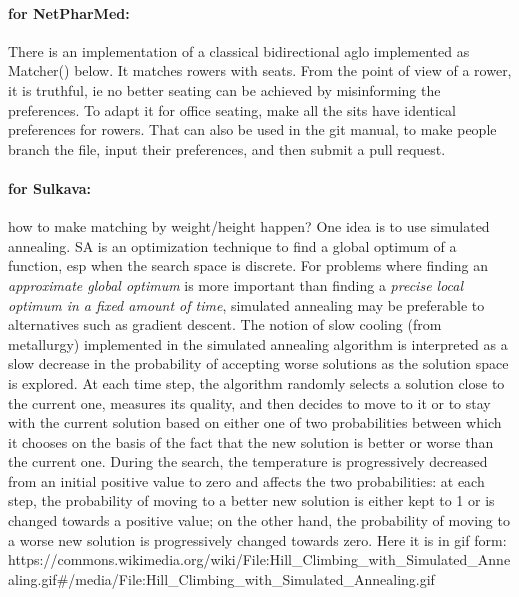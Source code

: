 \documentclass[11pt]{article}
\begin{document}
\hypertarget{for-netpharmed}{%
\paragraph{for NetPharMed:}\label{for-netpharmed}}

There is an implementation of a classical bidirectional aglo implemented
as Matcher() below. It matches rowers with seats. From the point of view
of a rower, it is truthful, ie no better seating can be achieved by
misinforming the preferences. To adapt it for office seating, make all
the sits have identical preferences for rowers. That can also be used in
the git manual, to make people branch the file, input their preferences,
and then submit a pull request.

\hypertarget{for-sulkava}{%
\paragraph{for Sulkava:}\label{for-sulkava}}

how to make matching by weight/height happen? One idea is to use
simulated annealing. SA is an optimization technique to find a global
optimum of a function, esp when the search space is discrete. For
problems where finding an \emph{approximate global optimum} is more
important than finding a \emph{precise local optimum in a fixed amount
of time}, simulated annealing may be preferable to alternatives such as
gradient descent. The notion of slow cooling (from metallurgy)
implemented in the simulated annealing algorithm is interpreted as a
slow decrease in the probability of accepting worse solutions as the
solution space is explored. At each time step, the algorithm randomly
selects a solution close to the current one, measures its quality, and
then decides to move to it or to stay with the current solution based on
either one of two probabilities between which it chooses on the basis of
the fact that the new solution is better or worse than the current one.
During the search, the temperature is progressively decreased from an
initial positive value to zero and affects the two probabilities: at
each step, the probability of moving to a better new solution is either
kept to 1 or is changed towards a positive value; on the other hand, the
probability of moving to a worse new solution is progressively changed
towards zero. Here it is in gif form:
https://commons.wikimedia.org/wiki/File:Hill\_Climbing\_with\_Simulated\_Annealing.gif\#/media/File:Hill\_Climbing\_with\_Simulated\_Annealing.gif
\end{document}
